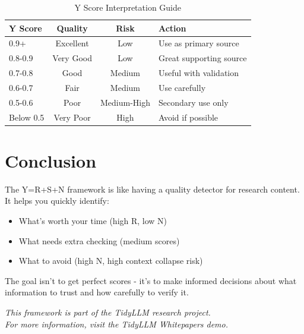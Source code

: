 \documentclass[11pt,a4paper]{article}
\begin{document}
\begin{table}[h]
\centering
\begin{tabular}{|l|c|c|l|}
\hline
\textbf{Y Score} & \textbf{Quality} & \textbf{Risk} & \textbf{Action} \\
\hline
0.9+ & Excellent & Low & Use as primary source \\
0.8-0.9 & Very Good & Low & Great supporting source \\
0.7-0.8 & Good & Medium & Useful with validation \\
0.6-0.7 & Fair & Medium & Use carefully \\
0.5-0.6 & Poor & Medium-High & Secondary use only \\
Below 0.5 & Very Poor & High & Avoid if possible \\
\hline
\end{tabular}
\caption{Y Score Interpretation Guide}
\end{table}

\section{Conclusion}

The Y=R+S+N framework is like having a quality detector for research content. It helps you quickly identify:

\begin{itemize}
\item What's worth your time (high R, low N)
\item What needs extra checking (medium scores)
\item What to avoid (high N, high context collapse risk)
\end{itemize}

\begin{tcolorbox}[colback=successgreen!10,colframe=successgreen,title=Remember]
The goal isn't to get perfect scores - it's to make informed decisions about what information to trust and how carefully to verify it.
\end{tcolorbox}

\vfill
\begin{center}
\textit{This framework is part of the TidyLLM research project.\\
For more information, visit the TidyLLM Whitepapers demo.}
\end{center}
\end{document}
